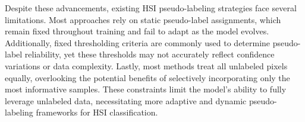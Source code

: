 Despite these advancements, existing HSI pseudo-labeling strategies face several limitations. Most approaches rely on static pseudo-label assignments, which remain fixed throughout training and fail to adapt as the model evolves. Additionally, fixed thresholding criteria are commonly used to determine pseudo-label reliability, yet these thresholds may not accurately reflect confidence variations or data complexity. Lastly, most methods treat all unlabeled pixels equally, overlooking the potential benefits of selectively incorporating only the most informative samples. These constraints limit the model’s ability to fully leverage unlabeled data, necessitating more adaptive and dynamic pseudo-labeling frameworks for HSI classification.